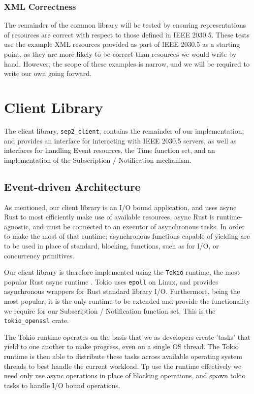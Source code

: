 \subsubsection{XML Correctness}
The remainder of the common library will be tested by ensuring representations of resources are correct with respect to those defined in IEEE 2030.5.
These tests use the example XML resources provided as part of IEEE 2030.5 as a starting point, as they are more likely to be correct than resources we would write by hand. However, the scope of these examples is narrow, and we will be required to write our own going forward.

\section{Client Library}
The client library, \texttt{sep2\_client}, contains the remainder of our implementation, and provides an interface for interacting with IEEE 2030.5 servers, as well as interfaces for handling Event resources, the Time function set, and an implementation of the Subscription / Notification mechanism. 

\subsection{Event-driven Architecture}
As mentioned, our client library is an I/O bound application, and uses async Rust to most efficiently make use of available resources. async Rust is runtime-agnostic, and must be connected to an executor of asynchronous tasks. In order to make the most of that runtime; asynchronous functions capable of yielding are to be used in place of standard, blocking, functions, such as for I/O, or concurrency primitives.

Our client library is therefore implemented using the \texttt{Tokio} runtime, the most popular Rust async runtime \cite{Tokio}. Tokio uses \texttt{epoll} on Linux, and provides asynchronous wrappers for Rust standard library I/O. Furthermore, being the most popular, it is the only runtime to be extended and provide the functionality we require for our Subscription / Notification function set. This is the \texttt{tokio\_openssl} crate.

The Tokio runtime operates on the basis that we as developers create 'tasks' that yield to one another to make progress, even on a single OS thread. The Tokio runtime is then able to distribute these tasks across available operating system threads to best handle the current workload. Tp use the runtime effectively we need only use async operations in place of blocking operations, and spawn tokio tasks to handle I/O bound operations.

